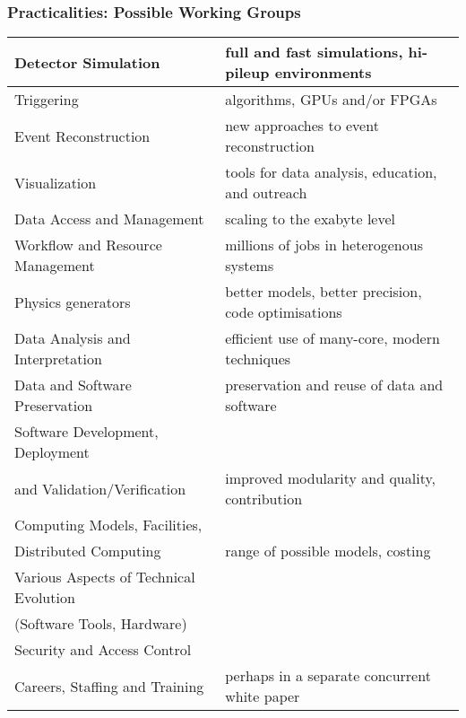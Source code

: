 \begin{frame}
\frametitle{Practicalities: Possible Working Groups}
\begin{table}[h!]
\tiny
\centering
\label{tab:table1}
\begin{tabular}{|l|l|}
\hline
Detector Simulation & full and fast simulations, hi-pileup environments \\ \hline

Triggering & algorithms, GPUs and/or FPGAs \\ \hline

Event Reconstruction & new approaches to event reconstruction \\ \hline

Visualization & tools for data analysis, education, and outreach \\ \hline

Data Access and Management & scaling to the exabyte level \\ \hline

Workflow and Resource Management & millions of jobs in heterogenous systems \\ \hline

Physics generators & better models, better precision, code optimisations \\ \hline

Data Analysis and Interpretation & efficient use of many-core, modern techniques \\ \hline

Data and Software Preservation & preservation and reuse of data and software \\ \hline

Software Development, Deployment & \\
and Validation/Verification & improved modularity and quality, contribution \\ \hline

Computing Models, Facilities, & \\
Distributed Computing & range of possible models, costing\\ \hline

Various Aspects of Technical Evolution & \\ 
(Software Tools, Hardware) &  \\ \hline

Security and Access Control & \\ \hline

Careers, Staffing and Training & perhaps in a separate concurrent white paper \\ \hline


\end{tabular}
\end{table}
\end{frame}
